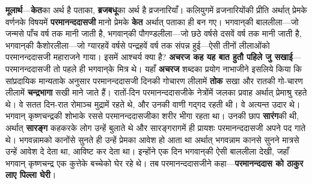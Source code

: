 \begin{sloppypar}\justifying{}
\textbf{मूलार्थ}—\textbf{केत}का अर्थ है पताका, \textbf{ब्रजबधू}का अर्थ है व्रजनारियाँ। कलियुगमें व्रजनारियोंकी प्रीति अर्थात् प्रेमके वर्णनके विषयमें \textbf{परमानन्द\-दासजी} मानो प्रेमके \textbf{केत} अर्थात् पताका ही बन गए। भगवान्‌की बाललीला—जो जन्मसे पाँच वर्ष तक मानी जाती है, भगवान्‌की पौगण्डलीला—जो छठे वर्षसे दसवें वर्ष तक मानी जाती है, भगवान्‌की कैशोरलीला—जो ग्यारहवें वर्षसे पन्द्रहवें वर्ष तक संपन्न हुई—ऐसी तीनों लीलाओंको परमानन्द\-दासजी महाराजने गाया। इसमें आश्चर्य क्या है? \textbf{अचरज कह यह बात हुतौ पहिले जु सखाई}—परमानन्द\-दासजी तो पहले ही भगवान्‌के मित्र थे। यहाँ \textbf{अचरज} शब्दका प्रयोग नाभाजीने इसलिये किया कि सांप्रदायिक मान्यताके अनुसार परमानन्द\-दासजी दिनकी गोचारण लीलामें \textbf{तोक} सखा और रातकी गो-चारण लीलामें \textbf{चन्द्रभागा} सखी माने जाते हैं। रातों-दिन परमानन्द\-दासजीके नेत्रोंमें जलका प्रवाह अर्थात् प्रेमाश्रु रहते थे। वे सतत दिन-रात रोमाञ्च मुद्रामें रहते थे, और उनकी वाणी गद्गद रहती थी। वे अत्यन्त उदार थे। भगवान् कृष्ण\-चन्द्रकी शोभाके रससे परमानन्द\-दासजीका शरीर भीगा रहता था। उनकी छाप \textbf{सारंग}की थी, अर्थात् \textbf{सारङ्ग} कहकरके लोग उन्हें बुलाते थे और सारङ्ग\-रागमें ही प्रायशः परमानन्द\-दासजी अपने पद गाते थे। भगवन्नामको कानोंसे सुनते ही उन्हें प्रेमका आवेश हो आता था अर्थात् भगवन्नाम कानसे सुनने मात्रसे उन्हें आवेश दे देता था, आविष्ट कर देता था। इन्होंने एक दिन भगवान्‌की ऐसी बाललीला देखी, जहाँ भगवान् कृष्ण\-चन्द्र एक कुत्तेके बच्चेको घेर रहे थे। तब परमानन्द\-दासजीने कहा—\textbf{परमानन्द\-दास को ठाकुर लाए पिल्ला घेरी}।
\end{sloppypar}



